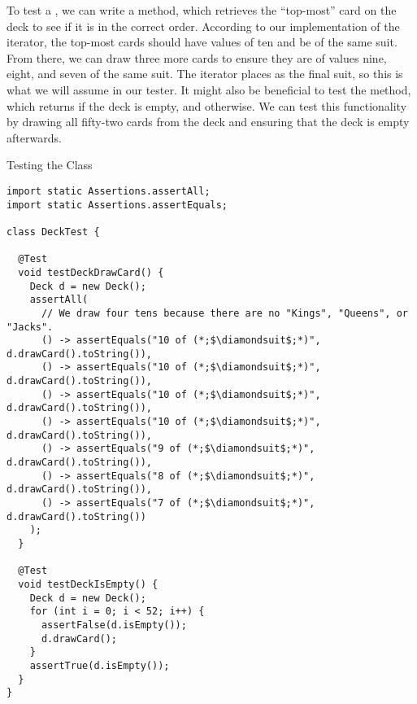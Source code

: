 To test a , we can write a  method, which retrieves the ``top-most'' card on the deck to see if it is in the correct order. According to our implementation of the iterator, the top-most cards should have values of ten and be of the same suit. From there, we can draw three more cards to ensure they are of values nine, eight, and seven of the same suit. The iterator places  as the final suit, so this is what we will assume in our tester. It might also be beneficial to test the  method, which returns  if the deck is empty, and  otherwise. We can test this functionality by drawing all fifty-two cards from the deck and ensuring that the deck is empty afterwards. 

\begin{cl}{Testing the  Class}
\begin{lstlisting}[language=MyJava]
import static Assertions.assertAll;
import static Assertions.assertEquals;

class DeckTest {

  @Test
  void testDeckDrawCard() {
    Deck d = new Deck();
    assertAll(
      // We draw four tens because there are no "Kings", "Queens", or "Jacks".
      () -> assertEquals("10 of (*;$\diamondsuit$;*)", d.drawCard().toString()),
      () -> assertEquals("10 of (*;$\diamondsuit$;*)", d.drawCard().toString()),
      () -> assertEquals("10 of (*;$\diamondsuit$;*)", d.drawCard().toString()),
      () -> assertEquals("10 of (*;$\diamondsuit$;*)", d.drawCard().toString()),
      () -> assertEquals("9 of (*;$\diamondsuit$;*)", d.drawCard().toString()),
      () -> assertEquals("8 of (*;$\diamondsuit$;*)", d.drawCard().toString()),
      () -> assertEquals("7 of (*;$\diamondsuit$;*)", d.drawCard().toString())
    );
  }

  @Test
  void testDeckIsEmpty() {
    Deck d = new Deck();
    for (int i = 0; i < 52; i++) {
      assertFalse(d.isEmpty());
      d.drawCard();
    }
    assertTrue(d.isEmpty());
  }
}
\end{lstlisting}
\end{cl}

